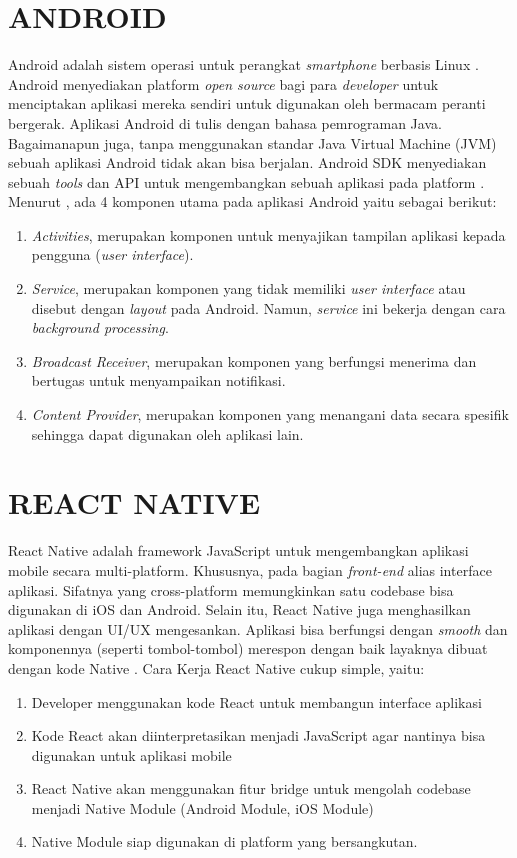 \section{\uppercase{ANDROID}}
Android adalah sistem operasi untuk perangkat \textit{smartphone} berbasis Linux \citep{Safaat2011}. Android menyediakan platform \textit{open source} bagi para \textit{developer} untuk menciptakan aplikasi mereka sendiri untuk digunakan oleh bermacam peranti bergerak. Aplikasi Android di tulis dengan bahasa pemrograman Java. Bagaimanapun juga, tanpa menggunakan standar Java Virtual Machine (JVM) sebuah aplikasi Android tidak akan bisa berjalan. Android SDK menyediakan sebuah \textit{tools} dan API untuk mengembangkan sebuah aplikasi pada platform \citep{Sarkar2019}. Menurut \cite{Supardi2011}, ada 4 komponen utama pada aplikasi Android yaitu sebagai berikut:
\begin{enumerate}[1.]
	\itemsep0em
	\item \emph{Activities}, merupakan komponen untuk menyajikan tampilan aplikasi kepada pengguna (\textit{user interface}).
	\item \emph{Service}, merupakan komponen yang tidak memiliki \textit{user interface} atau disebut dengan \textit{layout} pada Android. Namun, \textit{service} ini bekerja dengan cara \textit{background processing}.
	\item \emph{Broadcast Receiver}, merupakan komponen yang berfungsi menerima dan bertugas untuk menyampaikan notifikasi.
	\item \emph{Content Provider}, merupakan komponen yang menangani data secara spesifik sehingga dapat digunakan oleh aplikasi lain.
\end{enumerate}

\section{\uppercase{REACT NATIVE}}
React Native adalah framework JavaScript untuk mengembangkan aplikasi mobile secara multi-platform. Khususnya, pada bagian \textit{front-end} alias interface aplikasi. Sifatnya yang cross-platform memungkinkan satu codebase bisa digunakan di iOS dan Android. Selain itu, React Native juga menghasilkan aplikasi dengan UI/UX mengesankan. Aplikasi bisa berfungsi dengan \textit{smooth} dan komponennya (seperti tombol-tombol) merespon dengan baik layaknya dibuat dengan kode Native \citep{Brito2018}. Cara Kerja React Native cukup simple, yaitu:
\begin{enumerate}[1.]
	\itemsep0em
	\item Developer menggunakan kode React untuk membangun interface aplikasi
	\item Kode React akan diinterpretasikan menjadi JavaScript agar nantinya bisa digunakan untuk aplikasi mobile
	\item React Native akan menggunakan fitur bridge untuk mengolah codebase menjadi Native Module (Android Module, iOS Module)
	\item Native Module siap digunakan di platform yang bersangkutan.
\end{enumerate}

